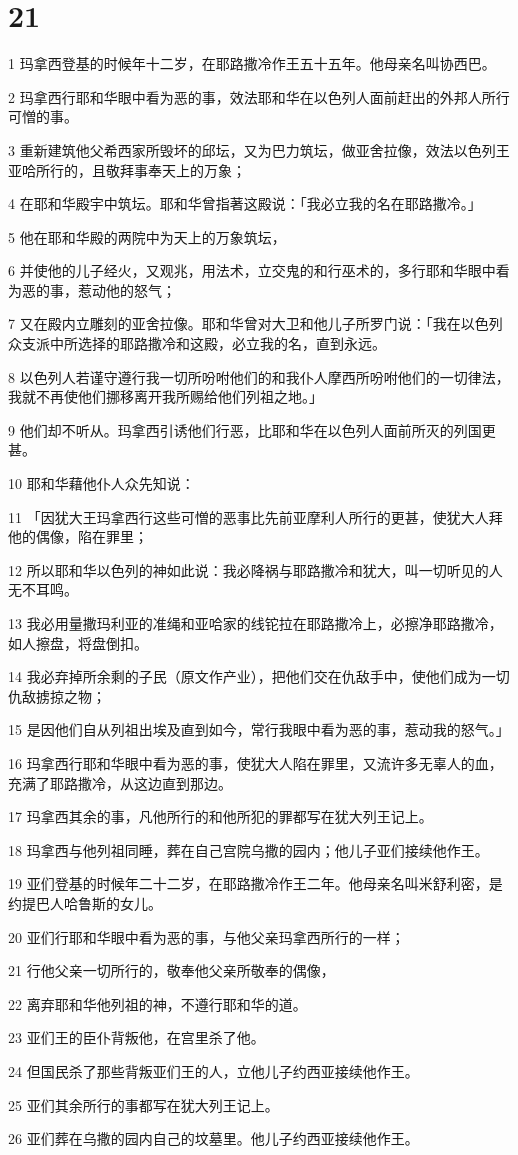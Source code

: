 \chapter{21}

\par 1 玛拿西登基的时候年十二岁，在耶路撒冷作王五十五年。他母亲名叫协西巴。
\par 2 玛拿西行耶和华眼中看为恶的事，效法耶和华在以色列人面前赶出的外邦人所行可憎的事。
\par 3 重新建筑他父希西家所毁坏的邱坛，又为巴力筑坛，做亚舍拉像，效法以色列王亚哈所行的，且敬拜事奉天上的万象；
\par 4 在耶和华殿宇中筑坛。耶和华曾指著这殿说：「我必立我的名在耶路撒冷。」
\par 5 他在耶和华殿的两院中为天上的万象筑坛，
\par 6 并使他的儿子经火，又观兆，用法术，立交鬼的和行巫术的，多行耶和华眼中看为恶的事，惹动他的怒气；
\par 7 又在殿内立雕刻的亚舍拉像。耶和华曾对大卫和他儿子所罗门说：「我在以色列众支派中所选择的耶路撒冷和这殿，必立我的名，直到永远。
\par 8 以色列人若谨守遵行我一切所吩咐他们的和我仆人摩西所吩咐他们的一切律法，我就不再使他们挪移离开我所赐给他们列祖之地。」
\par 9 他们却不听从。玛拿西引诱他们行恶，比耶和华在以色列人面前所灭的列国更甚。
\par 10 耶和华藉他仆人众先知说：
\par 11 「因犹大王玛拿西行这些可憎的恶事比先前亚摩利人所行的更甚，使犹大人拜他的偶像，陷在罪里；
\par 12 所以耶和华以色列的神如此说：我必降祸与耶路撒冷和犹大，叫一切听见的人无不耳鸣。
\par 13 我必用量撒玛利亚的准绳和亚哈家的线铊拉在耶路撒冷上，必擦净耶路撒冷，如人擦盘，将盘倒扣。
\par 14 我必弃掉所余剩的子民（原文作产业），把他们交在仇敌手中，使他们成为一切仇敌掳掠之物；
\par 15 是因他们自从列祖出埃及直到如今，常行我眼中看为恶的事，惹动我的怒气。」
\par 16 玛拿西行耶和华眼中看为恶的事，使犹大人陷在罪里，又流许多无辜人的血，充满了耶路撒冷，从这边直到那边。
\par 17 玛拿西其余的事，凡他所行的和他所犯的罪都写在犹大列王记上。
\par 18 玛拿西与他列祖同睡，葬在自己宫院乌撒的园内；他儿子亚们接续他作王。
\par 19 亚们登基的时候年二十二岁，在耶路撒冷作王二年。他母亲名叫米舒利密，是约提巴人哈鲁斯的女儿。
\par 20 亚们行耶和华眼中看为恶的事，与他父亲玛拿西所行的一样；
\par 21 行他父亲一切所行的，敬奉他父亲所敬奉的偶像，
\par 22 离弃耶和华他列祖的神，不遵行耶和华的道。
\par 23 亚们王的臣仆背叛他，在宫里杀了他。
\par 24 但国民杀了那些背叛亚们王的人，立他儿子约西亚接续他作王。
\par 25 亚们其余所行的事都写在犹大列王记上。
\par 26 亚们葬在乌撒的园内自己的坟墓里。他儿子约西亚接续他作王。

